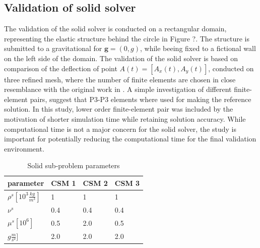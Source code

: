 \subsection{Validation of solid solver}
The validation of the solid solver is conducted on a rectangular domain, representing the elastic structure behind the circle in Figure ?.  The structure is submitted to a gravitational for $\mathbf{g} = (0, g)$, while beeing fixed to a fictional wall on the left side of the domain. The validation of the solid solver is based on comparison of the deflection of point $A(t) = [A_x(t), A_y(t)]$,  conducted on three refined mesh, where the number of finite elements are chosen in close resemblance with the original work in \cite{Hron2006}. A simple investigation of different finite-element pairs, suggest that P3-P3 elements where used for making the reference solution. In this study, lower order finite-element pair was included by the motivation of shorter simulation time while retaining solution accuracy. While computational time is not a major concern for the solid solver, the study is important for potentially reducing the computational time for the final validation environment.

\begin{table}[h!]
\centering
\label{my-label}
\begin{tabular}{ |p{3cm}||p{2cm}|p{2cm}|p{2cm}|  }
 \hline
 parameter              & CSM 1 & CSM 2 & CSM 3 \\
 \hline
$\rho^s [10^{3}\frac{kg}{m^3}]$ & 1    & 1    & 1    \\
$\nu^s $  & 0.4    & 0.4    & 0.4    \\
$\mu^s  [10^{6}]$  & 0.5    & 2.0    & 0.5    \\
$g  \frac{m}{s^2}]$  & 2.0    & 2.0    & 2.0    \\
\hline
\end{tabular}
\caption{Solid sub-problem parameters}
\end{table}

\newpage

